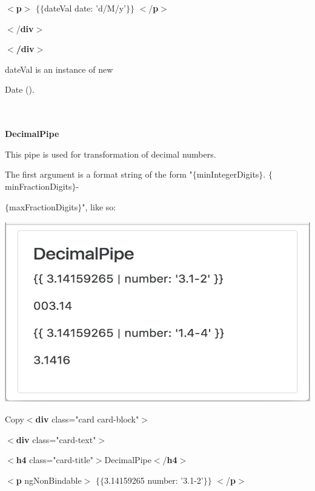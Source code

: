 \documentclass{article}
\begin{document}
$\mathrm{<}$\textbf{p}$\mathrm{>}$ $\mathrm{\{}$$\mathrm{\{}$dateVal {\textbar} date: 'd/M/y'$\mathrm{\}}$$\mathrm{\}}$ $\mathrm{<}$/\textbf{p}$\mathrm{>}$

$\mathrm{<}$/\textbf{div}$\mathrm{>}$

\noindent \textbf{$\boldsymbol{\mathrm{<}}$/div$\boldsymbol{\mathrm{>}}$}

\noindent 

\noindent dateVal is an instance of new 

\noindent Date ().

\noindent 
\newpage
\noindent \\ \\ {\large \textbf{DecimalPipe}}

\noindent This pipe is used for transformation of decimal numbers.

\noindent The first argument is a format string of the form "$\mathrm{\{}$minIntegerDigits$\mathrm{\}}$. $\mathrm{\{}$minFractionDigits$\mathrm{\}}$-

\noindent $\mathrm{\{}$maxFractionDigits$\mathrm{\}}$", like so:

\noindent 

\begin{center}
	\noindent \textbf{\includegraphics*[width=5.31in, height=3.11in]{IMG-03-03}}
\end{center}

\noindent Copy$\mathrm{<}$\textbf{div} class="card card-block"$\mathrm{>}$

$\mathrm{<}$\textbf{div} class="card-text"$\mathrm{>}$

$\mathrm{<}$\textbf{h4} class="card-title"$\mathrm{>}$DecimalPipe$\mathrm{<}$/\textbf{h4}$\mathrm{>}$

$\mathrm{<}$\textbf{p} ngNonBindable$\mathrm{>}$ $\mathrm{\{}$$\mathrm{\{}$3.14159265 {\textbar} number: '3.1-2'$\mathrm{\}}$$\mathrm{\}}$ $\mathrm{<}$/\textbf{p}$\mathrm{>}$
\end{document}
